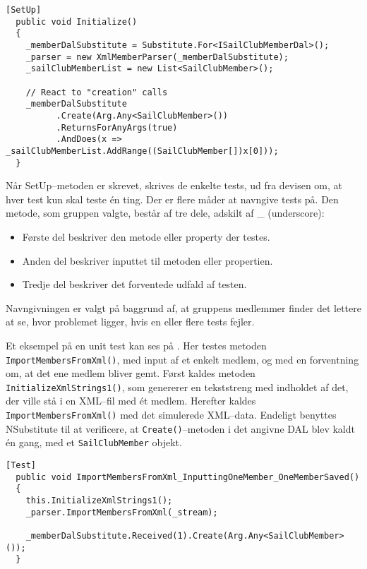 \begin{lstlisting}[frame=single, caption=Eksempel på Unit test SetUp, label=unit_test_setup]
  [SetUp]
  public void Initialize()
  {
    _memberDalSubstitute = Substitute.For<ISailClubMemberDal>();
    _parser = new XmlMemberParser(_memberDalSubstitute);
    _sailClubMemberList = new List<SailClubMember>();
    
    // React to "creation" calls
    _memberDalSubstitute
          .Create(Arg.Any<SailClubMember>())
          .ReturnsForAnyArgs(true)
          .AndDoes(x => _sailClubMemberList.AddRange((SailClubMember[])x[0]));
  }
\end{lstlisting}

Når SetUp--metoden er skrevet, skrives de enkelte tests, ud fra devisen om, at hver test kun skal teste én ting.
Der er flere måder at navngive tests på.
Den metode, som gruppen valgte, består af tre dele, adskilt af \_ (underscore):

\begin{itemize}
  \item Første del beskriver den metode eller property der testes.
  \item Anden del beskriver inputtet til metoden eller propertien.
  \item Tredje del beskriver det forventede udfald af testen.
\end{itemize}

Navngivningen er valgt på baggrund af, at gruppens medlemmer finder det lettere at se, hvor problemet ligger, hvis en eller flere tests fejler.

Et eksempel på en unit test kan ses på .
Her testes metoden \texttt{ImportMembersFromXml()}, med input af et enkelt medlem, og med en forventning om, at det ene medlem bliver gemt.
Først kaldes metoden \texttt{InitializeXmlStrings1()}, som genererer en tekststreng med indholdet af det, der ville stå i en XML--fil med ét medlem.
Herefter kaldes \texttt{ImportMembersFromXml()} med det simulerede XML--data.
Endeligt benyttes NSubstitute til at verificere, at \texttt{Create()}--metoden i det angivne \ac{DAL} blev kaldt én gang, med et \texttt{SailClubMember} objekt.


\begin{lstlisting}[frame=single, caption=Eksempel på Unit test, label=unit_test]
  [Test]
  public void ImportMembersFromXml_InputtingOneMember_OneMemberSaved()
  {
    this.InitializeXmlStrings1();
    _parser.ImportMembersFromXml(_stream);
    
    _memberDalSubstitute.Received(1).Create(Arg.Any<SailClubMember>());
  }
\end{lstlisting}

